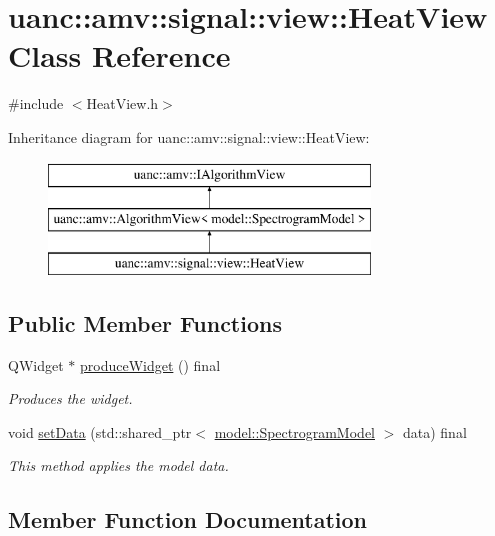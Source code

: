 \hypertarget{classuanc_1_1amv_1_1signal_1_1view_1_1_heat_view}{}\section{uanc\+:\+:amv\+:\+:signal\+:\+:view\+:\+:Heat\+View Class Reference}
\label{classuanc_1_1amv_1_1signal_1_1view_1_1_heat_view}


{\ttfamily \#include $<$Heat\+View.\+h$>$}

Inheritance diagram for uanc\+:\+:amv\+:\+:signal\+:\+:view\+:\+:Heat\+View\+:\begin{figure}[H]
\begin{center}
\leavevmode
\includegraphics[height=3.000000cm]{classuanc_1_1amv_1_1signal_1_1view_1_1_heat_view}
\end{center}
\end{figure}
\subsection*{Public Member Functions}
\begin{DoxyCompactItemize}
\item 
Q\+Widget $\ast$ \hyperlink{classuanc_1_1amv_1_1signal_1_1view_1_1_heat_view_a93ac20354fa17ab67e368e324f240c9a}{produce\+Widget} () final
\begin{DoxyCompactList}\small\item\em Produces the widget. \end{DoxyCompactList}\item 
void \hyperlink{classuanc_1_1amv_1_1signal_1_1view_1_1_heat_view_a0c6ded83c8aefdf05ff1abd8344763df}{set\+Data} (std\+::shared\+\_\+ptr$<$ \hyperlink{classuanc_1_1amv_1_1signal_1_1model_1_1_spectrogram_model}{model\+::\+Spectrogram\+Model} $>$ data) final
\begin{DoxyCompactList}\small\item\em This method applies the model data. \end{DoxyCompactList}\end{DoxyCompactItemize}


\subsection{Member Function Documentation}
